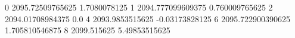 0 2095.72509765625 1.7080078125
1 2094.777099609375 0.760009765625
2 2094.01708984375 0.0
4 2093.9853515625 -0.03173828125
6 2095.722900390625 1.705810546875
8 2099.515625 5.49853515625
